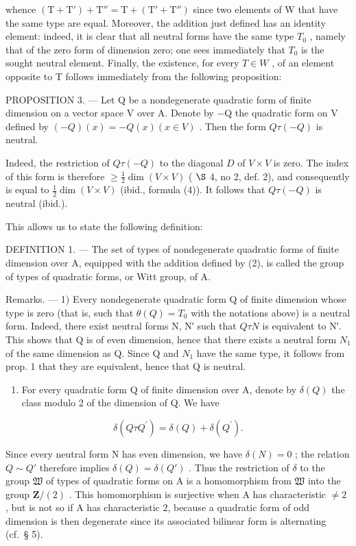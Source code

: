 whence \((\mathrm{T} + \mathrm{T}' ) + \mathrm{T}'' = \mathrm{T} + (\mathrm{T}' + \mathrm{T}'' )\) since two elements of W that have the same type are equal. Moreover, the addition just defined has an identity element: indeed, it is clear that all neutral forms have the same type \(T_{0}\) , namely that of the zero form of dimension zero; one sees immediately that \(T_{0}\) is the sought neutral element. Finally, the existence, for every \(T \in W\) , of an element opposite to T follows immediately from the following proposition:

PROPOSITION 3. — Let Q be a nondegenerate quadratic form of finite dimension on a vector space V over A. Denote by −Q the quadratic form on V defined by \((-Q)(x) = -Q(x) (x \in V)\) . Then the form \(Q \tau (-Q)\) is neutral.

Indeed, the restriction of \(Q \tau (-Q)\) to the diagonal \(D\) of \(V \times V\) is zero. The index of this form is therefore \(\geqslant\frac{1}{2}\dim(V\times V)\) ( \(\S\) 4, no 2, def. 2), and consequently is equal to \(\frac{1}{2}\dim(V\times V)\) (ibid., formula (4)). It follows that \(Q\tau(-Q)\) is neutral (ibid.).

This allows us to state the following definition:

DEFINITION 1. --- The set of types of nondegenerate quadratic forms of finite dimension over A, equipped with the addition defined by (2), is called the group of types of quadratic forms, or Witt group, of A.

Remarks. --- 1) Every nondegenerate quadratic form Q of finite dimension whose type is zero (that is, such that \(\theta(Q) = T_0\) with the notations above) is a neutral form. Indeed, there exist neutral forms N, N′ such that \(Q \tau N\) is equivalent to N′. This shows that Q is of even dimension, hence that there exists a neutral form \(N_1\) of the same dimension as Q. Since Q and \(N_1\) have the same type, it follows from prop. 1 that they are equivalent, hence that Q is neutral.

\begin{enumerate}
\def\labelenumi{\arabic{enumi})}
\setcounter{enumi}{1}
\tightlist
\item
  For every quadratic form Q of finite dimension over A, denote by \(\delta(Q)\) the class modulo 2 of the dimension of Q. We have
\end{enumerate}

\[
\delta (Q \tau Q ^ {\prime}) = \delta (Q) + \delta (Q ^ {\prime}).
\]

Since every neutral form N has even dimension, we have \(\delta(N) = 0\) ; the relation \(Q \sim Q'\) therefore implies \(\delta(Q) = \delta(Q')\) . Thus the restriction of \(\delta\) to the group \(\mathfrak{W}\) of types of quadratic forms on A is a homomorphism from \(\mathfrak{W}\) into the group \(\mathbf{Z}/(2)\) . This homomorphism is surjective when A has characteristic \(\neq 2\) , but is not so if A has characteristic 2, because a quadratic form of odd dimension is then degenerate since its associated bilinear form is alternating (cf.~§ 5).

